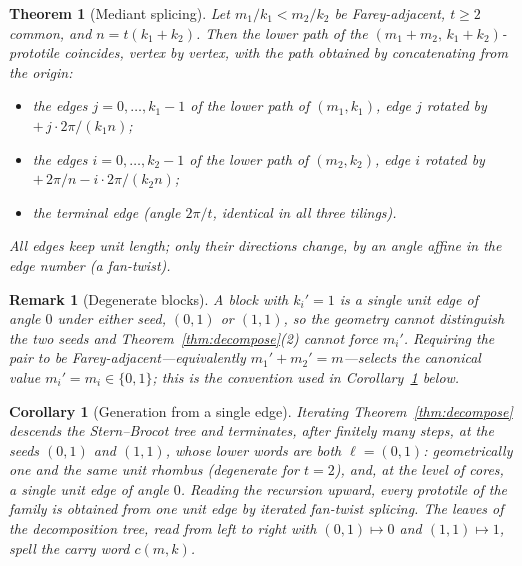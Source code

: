 \documentclass[10pt,a4paper]{amsart}
\newtheorem{theorem}{Theorem}
\newtheorem{remark}{Remark}
\newtheorem{corollary}{Corollary}
\begin{document}
\begin{theorem}[Mediant splicing]\label{thm:splice}
Let $m_1/k_1<m_2/k_2$ be Farey-adjacent, $t\ge2$ common, and $n=t(k_1+k_2)$.
Then the lower path of the $(m_1+m_2,\,k_1+k_2)$-prototile coincides, vertex by vertex,
with the path obtained by concatenating from the origin:
\begin{itemize}
\item the edges $j=0,\dots,k_1-1$ of the lower path of $(m_1,k_1)$, edge $j$ rotated by
$+\,j\cdot 2\pi/(k_1 n)$;
\item the edges $i=0,\dots,k_2-1$ of the lower path of $(m_2,k_2)$, edge $i$ rotated by
$+\,2\pi/n - i\cdot 2\pi/(k_2 n)$;
\item the terminal edge (angle $2\pi/t$, identical in all three tilings).
\end{itemize}
All edges keep unit length; only their directions change, by an angle affine in the
edge number (a \emph{fan-twist}).
\end{theorem}

\begin{remark}[Degenerate blocks]\label{rem:seeds}
A block with $k_i'=1$ is a single unit edge of angle $0$ under either seed, $(0,1)$ or
$(1,1)$, so the geometry cannot distinguish the two seeds and
Theorem~\ref{thm:decompose}(2) cannot force $m_i'$. Requiring the pair to be
Farey-adjacent---equivalently $m_1'+m_2'=m$---selects the canonical value
$m_i'=m_i\in\{0,1\}$; this is the convention used in Corollary~\ref{cor:generation}
below.
\end{remark}

\begin{corollary}[Generation from a single edge]\label{cor:generation}
Iterating Theorem~\ref{thm:decompose} descends the Stern--Brocot tree and terminates,
after finitely many steps, at the seeds $(0,1)$ and $(1,1)$, whose lower words are both
$\ell=(0,1)$: geometrically one and the same unit rhombus (degenerate for $t=2$), and,
at the level of cores, a single unit edge of angle $0$. Reading the recursion upward,
every prototile of the family is obtained from one unit edge by iterated fan-twist
splicing. The leaves of the decomposition tree, read from left to right with
$(0,1)\mapsto 0$ and $(1,1)\mapsto 1$, spell the carry word $c(m,k)$.
\end{corollary}
\end{document}
